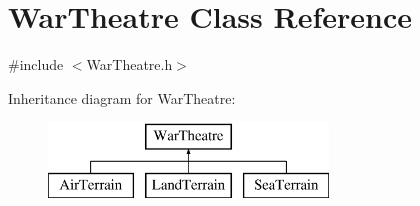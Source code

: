 \hypertarget{class_war_theatre}{}\section{War\+Theatre Class Reference}
\label{class_war_theatre}


{\ttfamily \#include $<$War\+Theatre.\+h$>$}

Inheritance diagram for War\+Theatre\+:\begin{figure}[H]
\begin{center}
\leavevmode
\includegraphics[height=2.000000cm]{class_war_theatre}
\end{center}
\end{figure}
